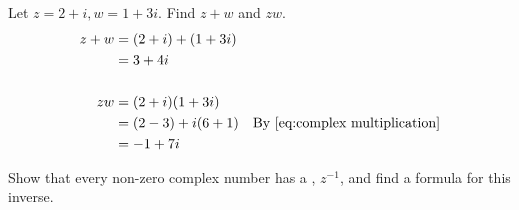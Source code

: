 \documentclass[11pt, oneside]{book}
\begin{document}
\begin{eg}\label{eg:1}
	Let $z = 2 + i, w = 1 + 3i$. Find $z + w$ and $zw$.
	\begin{align*}
		z + w &= (2 + i) + (1 + 3i) \\
			  	&= 3 + 4i \\
			  	\\
		zw 		&= (2 + i)(1 + 3i) \\
					&= (2 - 3) + i (6 + 1) \quad \text{By } \cref{eq:complex multiplication}\\
					&= -1 + 7i
	\end{align*}
\end{eg}

\begin{eg}\label{eg:multiplicative inverse of a complex number}
	Show that every non-zero complex number has a , $z^{-1}$, and find a formula for this inverse.


\end{eg}
\end{document}
